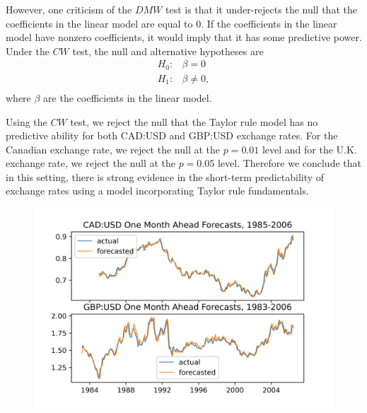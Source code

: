 \documentclass{article}
\begin{document}
However, one criticism of the $DMW$ test is that it under-rejects the null that the coefficients in the linear model are equal to 0. If the coefficients in the linear model have nonzero coefficients, it would imply that it has some predictive power. Under the $CW$ test, the null and alternative hypotheses are
\[\begin{split}
H_0:& \beta = 0 \\
H_1:& \beta \neq 0, \\
\end{split}\]
where $\beta$ are the coefficients in the linear model.


Using the $CW$ test, we reject the null that the Taylor rule model has no predictive ability for both CAD:USD and GBP:USD exchange rates. For the Canadian exchange rate, we reject the null at the $p=0.01$ level and for the U.K. exchange rate, we reject the null at the $p=0.05$ level. Therefore we conclude that in this setting, there is strong evidence in the short-term predictability of exchange rates using a model incorporating Taylor rule fundamentals.

\begin{figure}[H]
\centering
\includegraphics{forecasts1.png}
\end{figure}
\end{document}
